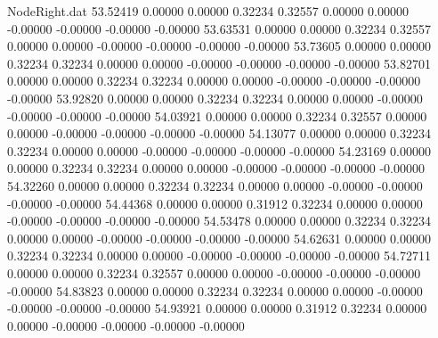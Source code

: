 \begin{filecontents}{NodeRight.dat}
  53.52419    0.00000    0.00000     0.32234    0.32557    0.00000    0.00000   -0.00000   -0.00000   -0.00000   -0.00000
  53.63531    0.00000    0.00000     0.32234    0.32557    0.00000    0.00000   -0.00000   -0.00000   -0.00000   -0.00000
  53.73605    0.00000    0.00000     0.32234    0.32234    0.00000    0.00000   -0.00000   -0.00000   -0.00000   -0.00000
  53.82701    0.00000    0.00000     0.32234    0.32234    0.00000    0.00000   -0.00000   -0.00000   -0.00000   -0.00000
  53.92820    0.00000    0.00000     0.32234    0.32234    0.00000    0.00000   -0.00000   -0.00000   -0.00000   -0.00000
  54.03921    0.00000    0.00000     0.32234    0.32557    0.00000    0.00000   -0.00000   -0.00000   -0.00000   -0.00000
  54.13077    0.00000    0.00000     0.32234    0.32234    0.00000    0.00000   -0.00000   -0.00000   -0.00000   -0.00000
  54.23169    0.00000    0.00000     0.32234    0.32234    0.00000    0.00000   -0.00000   -0.00000   -0.00000   -0.00000
  54.32260    0.00000    0.00000     0.32234    0.32234    0.00000    0.00000   -0.00000   -0.00000   -0.00000   -0.00000
  54.44368    0.00000    0.00000     0.31912    0.32234    0.00000    0.00000   -0.00000   -0.00000   -0.00000   -0.00000
  54.53478    0.00000    0.00000     0.32234    0.32234    0.00000    0.00000   -0.00000   -0.00000   -0.00000   -0.00000
  54.62631    0.00000    0.00000     0.32234    0.32234    0.00000    0.00000   -0.00000   -0.00000   -0.00000   -0.00000
  54.72711    0.00000    0.00000     0.32234    0.32557    0.00000    0.00000   -0.00000   -0.00000   -0.00000   -0.00000
  54.83823    0.00000    0.00000     0.32234    0.32234    0.00000    0.00000   -0.00000   -0.00000   -0.00000   -0.00000
  54.93921    0.00000    0.00000     0.31912    0.32234    0.00000    0.00000   -0.00000   -0.00000   -0.00000   -0.00000
\end{filecontents}
